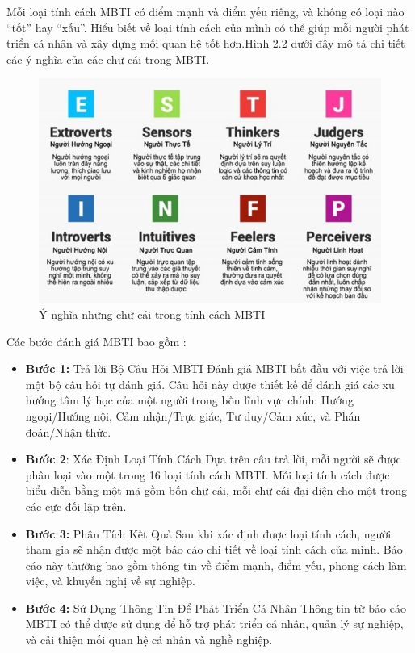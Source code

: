 Mỗi loại tính cách MBTI có điểm mạnh và điểm yếu riêng, và không có loại nào “tốt” hay “xấu”. Hiểu biết về loại tính cách của mình có thể giúp mỗi người phát triển cá nhân và xây dựng mối quan hệ tốt hơn.Hình 2.2 dưới đây mô tả chi tiết các ý nghĩa của các chữ cái trong MBTI.

\begin{figure}[H]
    \centering
    \includegraphics[width=0.8\linewidth, height=0.3\textheight]{images/MBTIper.png}
    \vspace{0.6cm}
    \caption{Ý nghĩa những chữ cái trong tính cách MBTI}
\end{figure}

Các bước đánh giá MBTI bao gồm : 
\begin{itemize}
    \item \textbf{Bước 1:} Trả lời Bộ Câu Hỏi MBTI Đánh giá MBTI bắt đầu với việc trả lời một bộ câu hỏi tự đánh giá. Câu hỏi này được thiết kế để đánh giá các xu hướng tâm lý học của một người trong bốn lĩnh vực chính: Hướng ngoại/Hướng nội, Cảm nhận/Trực giác, Tư duy/Cảm xúc, và Phán đoán/Nhận thức.
    \item \textbf{Bước 2}: Xác Định Loại Tính Cách Dựa trên câu trả lời, mỗi người sẽ được phân loại vào một trong 16 loại tính cách MBTI. Mỗi loại tính cách được biểu diễn bằng một mã gồm bốn chữ cái, mỗi chữ cái đại diện cho một trong các cực đối lập trên.
    \item \textbf{Bước 3:} Phân Tích Kết Quả Sau khi xác định được loại tính cách, người tham gia sẽ nhận được một báo cáo chi tiết về loại tính cách của mình. Báo cáo này thường bao gồm thông tin về điểm mạnh, điểm yếu, phong cách làm việc, và khuyến nghị về sự nghiệp.
    \item \textbf{Bước 4:} Sử Dụng Thông Tin Để Phát Triển Cá Nhân Thông tin từ báo cáo MBTI có thể được sử dụng để hỗ trợ phát triển cá nhân, quản lý sự nghiệp, và cải thiện mối quan hệ cá nhân và nghề nghiệp.
\end{itemize}

